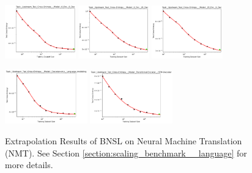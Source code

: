 \documentclass{article} %
\begin{document}
\vspace{5.85mm}



\begin{figure}[]
    \centering

\includegraphics[width=0.2725\textwidth]{figures/scaling_laws_benchmark_dataset_plots/log_perplexity___6_Enc,_6_Dec.png}
\includegraphics[width=0.2725\textwidth]{figures/scaling_laws_benchmark_dataset_plots/log_perplexity___6_Enc,_28_Dec.png}
\includegraphics[width=0.2725\textwidth]{figures/scaling_laws_benchmark_dataset_plots/log_perplexity___28_Enc,_6_Dec.png}

\vspace{-0.1mm}

\includegraphics[width=0.3175\textwidth]{figures/scaling_laws_benchmark_dataset_plots/log_perplexity___Decoder-only,_Language_modeling.png}
\includegraphics[width=0.3175\textwidth]{figures/scaling_laws_benchmark_dataset_plots/log_perplexity___Transfomer-Encoder,_LSTM-Decoder.png}
\vspace{-4.2mm}
    \caption{
    Extrapolation Results of BNSL on Neural Machine Translation (NMT). See Section \ref{section:scaling_benchmark__language} for more details.
    }
    \label{fig:scaling_laws_benchmark_dataset__nmt}
\end{figure}
\end{document}

